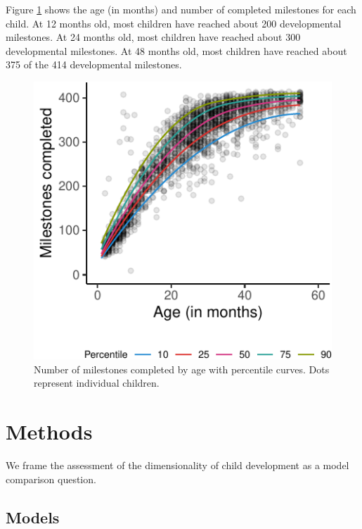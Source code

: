 \documentclass[10pt, letterpaper]{article}
\newenvironment{CodeChunk}{}{}
\begin{document}
Figure \ref{fig:growth} shows the age (in months) and number of
completed milestones for each child. At 12 months old, most children
have reached about 200 developmental milestones. At 24 months old, most
children have reached about 300 developmental milestones. At 48 months
old, most children have reached about 375 of the 414 developmental
milestones.

\begin{CodeChunk}
\begin{figure}[tb]
\includegraphics{figs/growth-1} \caption[Number of milestones completed by age with percentile curves]{Number of milestones completed by age with percentile curves. Dots represent individual children.}\label{fig:growth}
\end{figure}
\end{CodeChunk}

\hypertarget{methods}{%
\section{Methods}\label{methods}}

We frame the assessment of the dimensionality of child development as a
model comparison question.

\hypertarget{models}{%
\subsection{Models}\label{models}}
\end{document}

